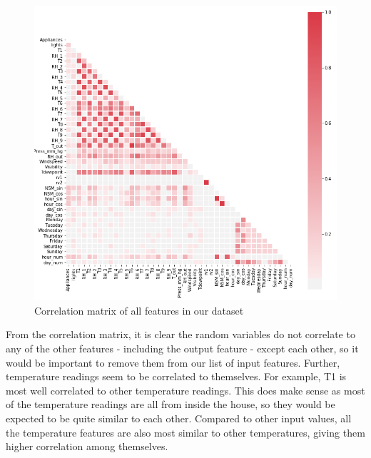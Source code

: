 \documentclass{article}
\begin{document}
\begin{figure}[H]
\centering
\includegraphics[width=1\textwidth, keepaspectratio]{imgs/all-corr.png}
\caption{Correlation matrix of all features in our dataset}
\end{figure}
\noindent
From the correlation matrix, it is clear the random variables do not correlate to any of the other features - including the output feature - except each other, so it would be important to remove them from our list of input features. Further, temperature readings seem to be correlated to themselves. For example, T1 is most well correlated to other temperature readings. This does make sense as most of the temperature readings are all from inside the house, so they would be expected to be quite similar to each other. Compared to other input values, all the temperature features are also most similar to other temperatures, giving them higher correlation among themselves. 
\end{document}
